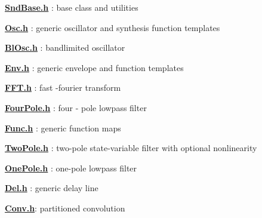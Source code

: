 {\bfseries \hyperlink{_snd_base_8h}{Snd\+Base.\+h}} \+: base class and utilities

{\bfseries \hyperlink{_osc_8h}{Osc.\+h}} \+: generic oscillator and synthesis function templates

{\bfseries \hyperlink{_bl_osc_8h}{Bl\+Osc.\+h}} \+: bandlimited oscillator

{\bfseries \hyperlink{_env_8h}{Env.\+h}} \+: generic envelope and function templates

{\bfseries \hyperlink{_f_f_t_8h}{F\+F\+T.\+h}} \+: fast -\/fourier transform

{\bfseries \hyperlink{_four_pole_8h}{Four\+Pole.\+h}} \+: four -\/ pole lowpass filter

{\bfseries \hyperlink{_func_8h}{Func.\+h}} \+: generic function maps

{\bfseries \hyperlink{_two_pole_8h}{Two\+Pole.\+h}} \+: two-\/pole state-\/variable filter with optional nonlinearity

{\bfseries \hyperlink{_one_pole_8h}{One\+Pole.\+h}} \+: one-\/pole lowpass filter

{\bfseries \hyperlink{_del_8h}{Del.\+h}} \+: generic delay line

{\bfseries \hyperlink{_conv_8h}{Conv.\+h}}\+: partitioned convolution 
